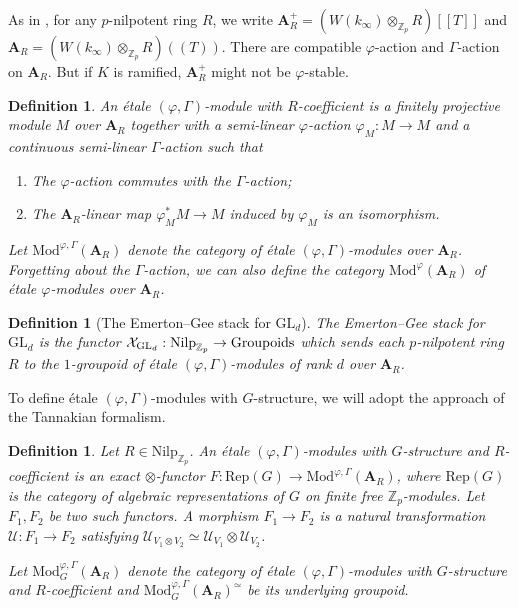 \documentclass[10pt]{article}
\newtheorem{dfn}[thm]{Definition}
\numberwithin{equation}{section}
\newcommand{\bZ}{{\mathbb Z}}
\newcommand{\calU}{{\mathcal U}}
\newcommand{\calX}{{\mathcal X}}
\newcommand{\Mod}{{\mathrm{Mod}}}           %
\newcommand{\Rep}{{\mathrm{Rep}}}           %
\newcommand{\GL}{{\mathrm{GL}}}             %
\newcommand{\Nilp}{\mathrm{Nilp}}
\newcommand{\bfA}{{\textbf{A}}}
\begin{document}
As in \cite{EG22}, for any $p$-nilpotent ring $R$, we write $\bfA_R^+=(W(k_{\infty})\otimes_{\bZ_p}R)[[T]]$ and $\bfA_R=(W(k_{\infty})\otimes_{\bZ_p}R)((T))$. There are compatible $\varphi$-action and $\Gamma$-action on $\bfA_R$. But if $K$ is ramified, $\bfA_R^+$ might not be $\varphi$-stable.

\begin{dfn}
     An \'etale $(\varphi,\Gamma)$-module with $R$-coefficient is a finitely projective module $M$ over $\bfA_R$ together with a semi-linear $\varphi$-action $\varphi_M:M\to M$ and a continuous semi-linear $\Gamma$-action such that
     \begin{enumerate}
         \item The $\varphi$-action commutes with the $\Gamma$-action;
         \item The $\bfA_R$-linear map $\varphi^*_MM\to M$ induced by $\varphi_M$ is an isomorphism.
     \end{enumerate}
     Let $\Mod^{\varphi,\Gamma}(\bfA_R)$ denote the category of \'etale $(\varphi,\Gamma)$-modules over $\bfA_R$. Forgetting about the $\Gamma$-action, we can also define the category $\Mod^{\varphi}(\bfA_R)$ of \'etale $\varphi$-modules over $\bfA_R$.
\end{dfn}

\begin{dfn}[The Emerton--Gee stack for $\GL_d$]
    The Emerton--Gee stack for $\GL_d$ is the functor $\calX_{\GL_d}:\Nilp_{\bZ_p}\to {\rm Groupoids}$ which sends each $p$-nilpotent ring $R$ to the $1$-groupoid of \'etale $(\varphi,\Gamma)$-modules of rank $d$ over $\bfA_R$.
\end{dfn}






To define \'etale $(\varphi,\Gamma)$-modules with $G$-structure, we will adopt the approach of the Tannakian formalism.

\begin{dfn}
Let $R\in \Nilp_{\bZ_p}$. An \'etale $(\varphi,\Gamma)$-modules with $G$-structure and $R$-coefficient is an exact $\otimes$-functor $F:\Rep(G)\to \Mod^{\varphi,\Gamma}(\bfA_R)$, where $\Rep(G)$ is the category of algebraic representations of $G$ on finite free $\bZ_p$-modules. Let $F_1, F_2$ be two such functors. A morphism $F_1\to F_2$ is a natural transformation $\calU: F_1\to F_2$ satisfying $\calU_{V_1\otimes V_2}\simeq\calU_{V_1}\otimes\calU_{V_2}$.

Let $\Mod^{\varphi,\Gamma}_{G}(\bfA_R)$ denote the category of \'etale $(\varphi,\Gamma)$-modules with $G$-structure and $R$-coefficient and $\Mod^{\varphi,\Gamma}_{G}(\bfA_R)^{\simeq}$ be its underlying groupoid.
\end{dfn}
\end{document}
